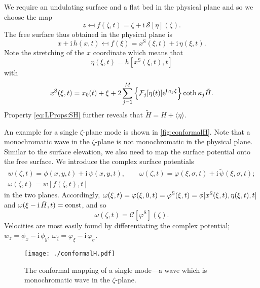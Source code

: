 \documentclass[a4paper,12pt]{article}
\newcommand{\mr}{\mathrm}
\newcommand{\mc}{\mathcal}
\renewcommand{\S}{^\mr{S}}
\newcommand{\ii}{\mr{i}\,}
\newcommand{\ee}{\mr{e}}
\renewcommand{\_}[1]{_\mr{#1}}
\let\Re\relax
\let\Im\relax
\DeclareMathOperator\Re{Re}
\DeclareMathOperator\Im{Im}
\newcommand{\w}{w}
\newcommand{\z}{z}
\newcommand{\x}{x}
\newcommand{\y}{y}
\newcommand{\zz}{\zeta}
\newcommand{\xx}{\xi}
\newcommand{\yy}{\sigma}
\newcommand{\kk}{\kappa}
\newcommand{\zmap}{f}
\newcommand{\ww}{\omega}
\renewcommand{\w}{w}
\newcommand{\Hz}{H}
\newcommand{\Hzz}{\tilde H}
\newcommand{\hzz}{\eta}
\newcommand{\hz}{h}
\newcommand{\Lsin}{\mc S}
\newcommand{\Lcos}{\mc C}
\newcommand{\FF}{\mc F}
\newcommand{\xS}{\x\S}
\begin{document}
We require an undulating surface and a flat bed in the physical plane 
and so we choose the map
\begin{equation}
\z\mapsfrom \zmap(\zz,t) = \zz+\ii\Lsin[\hzz](\zz).
\label{eq:zmap}
\end{equation}
The free surface thus obtained in the physical plane is
\[\x+\ii\hz(\x,t)\mapsfrom \zmap(\xx)=\xS(\xx,t)+\ii\hzz(\xx,t).\]
Note the stretching of the $\x$ coordinate which means that 
\begin{equation}
\hzz(\xx,t) = \hz[\xS(\xx,t),t]
\label{eq:hzz}
\end{equation}
 with 
\[\xS(\xx,t)=\x_0(t)+\xx+2\sum_{j=1}^M \Im\Big\{\FF_j[\hzz(t)] \ee^{\ii \kk_j\xx}\Big\}\coth\kk_j\Hzz.\] 
Property \eqref{eq:LProps:SH} further reveals that $\Hzz = \Hz+\langle\eta\rangle$.

An example for a single $\zz$-plane mode is shown in \autoref{fig:conformalH}.
Note that a monochromatic wave in the $\zz$-plane is not monochromatic in the physical plane.
\\

Similar to the surface elevation, we also need to map the surface potential onto the free surface.
We introduce the complex surface potentials  
\begin{subequations}
\begin{gather}
\w(\zz,t)=\phi(\x,\y,t)+\ii\psi(\x,\y,t),
\qquad
\ww(\zz,t)=\varphi(\xx,\yy,t)+\ii\tilde\psi(\xx,\yy,t);
\\
\ww(\zz,t)=\w[\zmap(\zz,t),t] \label{eq:ww:match}
\end{gather}%
\end{subequations}%
in the two planes.
Accordingly, 
$\Re \ww(\xx,t)=\varphi(\xx,0,t)=\varphi\S(\xx,t)=\phi[\xS(\xx,t),\hzz(\xx,t),t]$
 and $\Im \ww(\xx-\ii \Hzz,t)=\mr{const}$, and so
\begin{equation}
\ww(\zz,t) = \Lcos[\varphi\S](\zz).
\label{eq:ww}
\end{equation}
Velocities are most easily found by differentiating the complex potential; $\w_\z = \phi_\x-\ii\phi_\y$, $\ww_\zz = \varphi_\xx-\ii\varphi_\yy$.

\begin{figure}[h!ptb]%
\centering
\texttt{[image: ./conformalH.pdf]}%
\caption{The conformal mapping of a single mode---a wave which is monochromatic wave in the $\zz$-plane.}%
\label{fig:conformalH}%
\end{figure}
\end{document}

